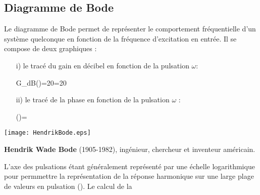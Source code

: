 \subsection*{Diagramme de Bode}
Le diagramme de Bode permet de représenter le comportement fréquentielle 
d'un système quelconque en fonction de la fréquence d'excitation en entrée. 
Il se compose de deux graphiques :
\begin{itemize}
    \item[i)] le tracé du gain en décibel en fonction de la pulsation $\omega$:
        \begin{bequation} 
            G_{dB}(\omega)=20=20 
        \end{bequation}
    \item[ii)] le tracé de la phase en fonction de la pulsation $\omega$ :
        \begin{bequation} 
            \phi(\omega)=
        \end{bequation}
\end{itemize}
\begin{marginfigure}
    \centering
    \texttt{[image: HendrikBode.eps]} 
    \caption*{\textbf{Hendrik Wade Bode}
    (1905-1982), ingénieur, chercheur et inventeur américain.}
\end{marginfigure}
L'axe des pulsations étant généralement représenté par une échelle 
logarithmique pour permmettre la représentation de la réponse harmonique sur 
une large plage de valeurs en pulsation (). Le calcul de la
